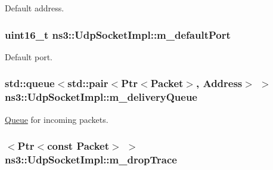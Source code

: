 Default address. 

\subsubsection[{\texorpdfstring{m\+\_\+default\+Port}{m_defaultPort}}]{\setlength{\rightskip}{0pt plus 5cm}uint16\+\_\+t ns3\+::\+Udp\+Socket\+Impl\+::m\+\_\+default\+Port\hspace{0.3cm}{\ttfamily [private]}}\hypertarget{classns3_1_1UdpSocketImpl_a990120b2cc768c47a6a2a2a1e53875c8}{}\label{classns3_1_1UdpSocketImpl_a990120b2cc768c47a6a2a2a1e53875c8}


Default port. 

\subsubsection[{\texorpdfstring{m\+\_\+delivery\+Queue}{m_deliveryQueue}}]{\setlength{\rightskip}{0pt plus 5cm}std\+::queue$<$std\+::pair$<${\bf Ptr}$<${\bf Packet}$>$, {\bf Address}$>$ $>$ ns3\+::\+Udp\+Socket\+Impl\+::m\+\_\+delivery\+Queue\hspace{0.3cm}{\ttfamily [private]}}\hypertarget{classns3_1_1UdpSocketImpl_a6a95636f11b186eab1f70727500d9233}{}\label{classns3_1_1UdpSocketImpl_a6a95636f11b186eab1f70727500d9233}


\hyperlink{classns3_1_1Queue}{Queue} for incoming packets. 

\subsubsection[{\texorpdfstring{m\+\_\+drop\+Trace}{m_dropTrace}}]{$<${\bf Ptr}$<$const {\bf Packet}$>$ $>$ ns3\+::\+Udp\+Socket\+Impl\+::m\+\_\+drop\+Trace\hspace{0.3cm}{\ttfamily [private]}}\hypertarget{classns3_1_1UdpSocketImpl_a786fed61e3c4c68280656c4036514c11}{}\label{classns3_1_1UdpSocketImpl_a786fed61e3c4c68280656c4036514c11}


